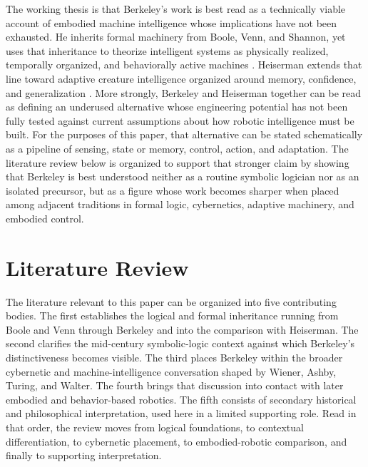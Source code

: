 \documentclass[11pt]{article}
\begin{document}
The working thesis is that Berkeley's work is best read as a technically viable account of embodied machine intelligence whose implications have not been exhausted. He inherits formal machinery from Boole, Venn, and Shannon, yet uses that inheritance to theorize intelligent systems as physically realized, temporally organized, and behaviorally active machines \citep{boole1847mathematical,boole1854laws,venn1894symbolic,shannon1938symbolic}. Heiserman extends that line toward adaptive creature intelligence organized around memory, confidence, and generalization \citep{heiserman1981robot}. More strongly, Berkeley and Heiserman together can be read as defining an underused alternative whose engineering potential has not been fully tested against current assumptions about how robotic intelligence must be built. For the purposes of this paper, that alternative can be stated schematically as a pipeline of sensing, state or memory, control, action, and adaptation. The literature review below is organized to support that stronger claim by showing that Berkeley is best understood neither as a routine symbolic logician nor as an isolated precursor, but as a figure whose work becomes sharper when placed among adjacent traditions in formal logic, cybernetics, adaptive machinery, and embodied control.

\section{Literature Review}

The literature relevant to this paper can be organized into five contributing bodies. The first establishes the logical and formal inheritance running from Boole and Venn through Berkeley and into the comparison with Heiserman. The second clarifies the mid-century symbolic-logic context against which Berkeley's distinctiveness becomes visible. The third places Berkeley within the broader cybernetic and machine-intelligence conversation shaped by Wiener, Ashby, Turing, and Walter. The fourth brings that discussion into contact with later embodied and behavior-based robotics. The fifth consists of secondary historical and philosophical interpretation, used here in a limited supporting role. Read in that order, the review moves from logical foundations, to contextual differentiation, to cybernetic placement, to embodied-robotic comparison, and finally to supporting interpretation.
\end{document}
